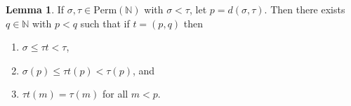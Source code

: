 \documentclass[oneside,11pt]{amsart}
\newcommand{\nn}{\ensuremath{\mathbb{N}}}
\newcommand{\Perm}{\ensuremath{\text{Perm}}}
\theoremstyle{definition}
\newtheorem{proof techniques}{Proof Techniques}
\newtheorem{lemma}{Lemma}
\begin{document}
\begin{lemma}\label{lem: going down in bruhat using transpositions}
If $\sigma , \tau \in \Perm(\nn)$ with $\sigma < \tau$, let $p = d(\sigma , \tau)$. Then there exists $q \in \nn$ with $p < q$ such that if $t = (p ,  q)$ then

\begin{enumerate}

\item $\sigma \leq \tau t < \tau$,

\item $\sigma(p) \leq \tau t(p) < \tau(p)$, and 

\item $\tau t(m) = \tau(m)$ for all $m < p$. 

\end{enumerate}
\end{lemma}
\end{document}
